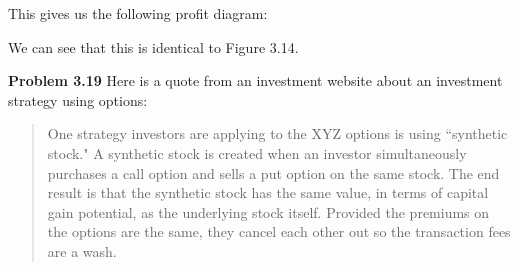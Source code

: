 \documentclass[12pt]{article}
\newcommand{\problem}[1]{\bigskip \noindent \textbf{Problem #1}}
\theoremstyle{plain}
\begin{document}
\begin{enumerate}[(a)]
This gives us the following profit diagram:
\begin{center}
\end{center}
We can see that this is identical to Figure 3.14.
\end{enumerate}

\problem{3.19} Here is a quote from an investment website about an investment strategy using options:
\begin{quotation}
One strategy investors are applying to the XYZ options is using ``synthetic stock." A synthetic stock is created when an investor simultaneously purchases a call option and sells a put option on the same stock. The end result is that the synthetic stock has the same value, in terms of capital gain potential, as the underlying stock itself. Provided the premiums on the options are the same, they cancel each other out so the transaction fees are a wash.
\end{quotation}
\end{document}
